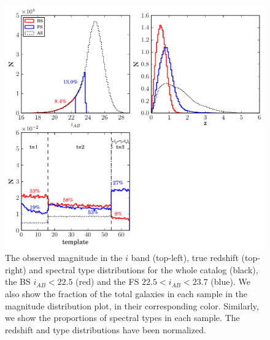 \begin{figure}
\centering
\includegraphics[width=130mm]{./plots/mzt_pau.pdf}
\caption{The observed magnitude in the $i$ band (top-left), true redshift (top-right) and spectral type distributions for the whole catalog (black), the BS $i_{AB}<22.5$ (red) and the FS $22.5<i_{AB}<23.7$ (blue). We also show the fraction of the total galaxies in each sample in the magnitude distribution plot, in their corresponding color. Similarly, we show the proportions of spectral types in each sample. The redshift and type distributions have been normalized.}
\label{mzt_dist}
\end{figure}
